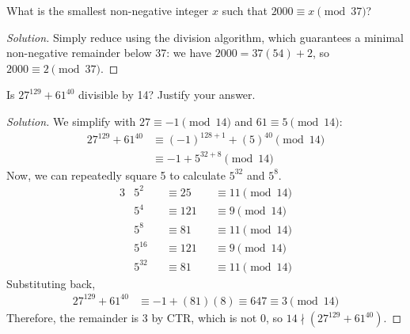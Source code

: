 \documentclass{agony}
\begin{document}
\question What is the smallest non-negative integer $x$ such that $2000 \equiv x \pmod{37}$?
\begin{proof}[Solution]
  Simply reduce using the division algorithm, which guarantees a minimal non-negative remainder below 37:
  we have $2000 = 37(54) + 2$, so $2000 \equiv 2 \pmod{37}$.
\end{proof}



\question Is $27^{129}+61^{40}$ divisible by 14? Justify your answer.
\begin{proof}[Solution]
  We simplify with $27 \equiv -1 \pmod{14}$ and $61 \equiv 5 \pmod{14}$:
  \begin{align*}
    27^{129}+61^{40} & \equiv (-1)^{128+1}+(5)^{40} \pmod{14} \\
                     & \equiv -1 + 5^{32+8} \pmod{14}
  \end{align*}
  Now, we can repeatedly square 5 to calculate $5^{32}$ and $5^8$.
  \begin{alignat*}{3}
     & 5^2    &  & \equiv 25  &  & \equiv 11 \pmod{14} \\
     & 5^4    &  & \equiv 121 &  & \equiv 9 \pmod{14}  \\
     & 5^8    &  & \equiv 81  &  & \equiv 11 \pmod{14} \\
     & 5^{16} &  & \equiv 121 &  & \equiv 9 \pmod{14}  \\
     & 5^{32} &  & \equiv 81  &  & \equiv 11 \pmod{14}
  \end{alignat*}
  Substituting back,
  \begin{align*}
    27^{129}+61^{40} & \equiv -1 + (81)(8) \equiv 647 \equiv 3 \pmod{14}
  \end{align*}
  Therefore, the remainder is 3 by CTR, which is not 0, so $14 \nmid (27^{129}+61^{40})$.
\end{proof}
\end{document}

